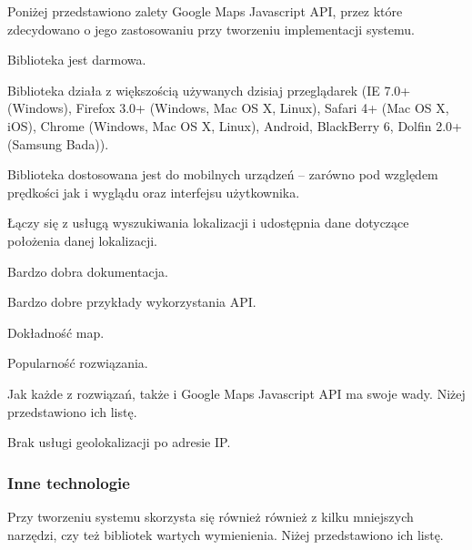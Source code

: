 Poniżej przedstawiono zalety Google Maps Javascript API, przez które zdecydowano o jego zastosowaniu przy tworzeniu implementacji systemu.
\begin{packed_item}
    \item{Biblioteka jest darmowa.}
    \item{Biblioteka działa z większością używanych dzisiaj przeglądarek (IE 7.0+ (Windows), Firefox 3.0+ (Windows, Mac OS X, Linux), Safari 4+ (Mac OS X, iOS), Chrome (Windows, Mac OS X, Linux), Android, BlackBerry 6, Dolfin 2.0+ (Samsung Bada)).}
    \item{Biblioteka dostosowana jest do mobilnych urządzeń -- zarówno pod względem prędkości jak i wyglądu oraz interfejsu użytkownika.}
    \item{Łączy się z usługą wyszukiwania lokalizacji i udostępnia dane dotyczące położenia danej lokalizacji.}
    \item{Bardzo dobra dokumentacja.}
    \item{Bardzo dobre przykłady wykorzystania API.}
    \item{Dokładność map.}
    \item{Popularność rozwiązania.}
\end{packed_item}

Jak każde z rozwiązań, także i Google Maps Javascript API ma swoje wady. Niżej przedstawiono ich listę.
\begin{packed_item}
    \item{Brak usługi geolokalizacji po adresie IP.}
\end{packed_item}


\newpage
\subsubsection{Inne technologie}
Przy tworzeniu systemu skorzysta się również również z kilku mniejszych narzędzi, czy też bibliotek wartych wymienienia. Niżej przedstawiono ich listę.

